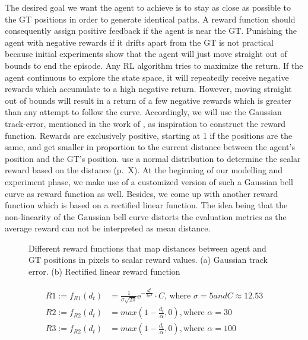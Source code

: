 The desired goal we want the agent to achieve is to stay as close as possible to the GT positions in order to generate identical paths. A reward function should consequently assign positive feedback if the agent is near the GT. Punishing the agent with negative rewards if it drifts apart from the GT is not practical because initial experiments show that the agent will just move straight out of bounds to end the episode. Any RL algorithm tries to maximize the return. If the agent continuous to explore the state space, it will repeatedly receive negative rewards which accumulate to a high negative return. However, moving straight out of bounds will result in a return of a few negative rewards which is greater than any attempt to follow the curve. Accordingly, we will use the Gaussian track-error, mentioned in the work of \cite{martinsen2018curved}, as inspiration to construct the reward function. Rewards are exclusively positive, starting at 1 if the positions are the same, and get smaller in proportion to the current distance between the agent's position and the GT's position. \cite{martinsen2018curved} use a normal distribution to determine the scalar reward based on the distance (p.~X). At the beginning of our modelling and experiment phase, we make use of a customized version of such a Gaussian bell curve as reward function as well. Besides, we come up with another reward function which is based on a rectified linear function. The idea being that the non-linearity of the Gaussian bell curve distorts the evaluation metrics as the average reward can not be interpreted as mean distance. 

\begin{figure}[H]
    \centering
    \begin{subfigure}[b]{0.49\textwidth}
        \centering
        
        \caption{}
        \label{fig:reward1}
    \end{subfigure}
    \hfill
    \begin{subfigure}[b]{0.49\textwidth}
        \centering
        
        \caption{}
        \label{fig:reward2}
    \end{subfigure}
    \caption{Different reward functions that map distances between agent and GT positions in pixels to scalar reward values. (a) Gaussian track error. (b) Rectified linear reward function}
    \label{fig:rewardFunctions}
\end{figure}


\begin{equation}
\begin{aligned}
    R1 := f_{R1}(d_t) &= \frac{1}{\sigma \sqrt{2\pi}} \mathrm{e}^{-\frac{d_t^2}{2\sigma^2}} \cdot C \text{, where $\sigma = 5 and C \approx 12.53$}
\\
R2 := f_{R2}(d_t) &= max(1 - \frac{d_t}{\alpha}, 0) , \text{where $\alpha = 30$}
\\
R3 := f_{R2}(d_t) &= max(1 - \frac{d_t}{\alpha}, 0) , \text{where $\alpha = 100$}
    \end{aligned}
\end{equation}
